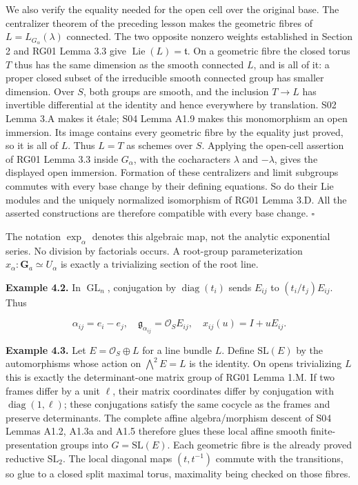 \documentclass[11pt,a4paper,openany]{report}
\begin{document}
We also verify the equality needed for the open cell over the original base. The centralizer theorem of the preceding lesson makes the geometric fibres of \(L=L_{G_\alpha}(\lambda)\) connected. The two opposite nonzero weights established in Section 2 and RG01 Lemma 3.3 give \(\operatorname{Lie}(L)=\mathfrak t\). On a geometric fibre the closed torus \(T\) thus has the same dimension as the smooth connected \(L\), and is all of it: a proper closed subset of the irreducible smooth connected group has smaller dimension. Over \(S\), both groups are smooth, and the inclusion \(T\to L\) has invertible differential at the identity and hence everywhere by translation. S02 Lemma 3.A makes it étale; S04 Lemma A1.9 makes this monomorphism an open immersion. Its image contains every geometric fibre by the equality just proved, so it is all of \(L\). Thus \(L=T\) as schemes over \(S\). Applying the open-cell assertion of RG01 Lemma 3.3 inside \(G_\alpha\), with the cocharacters \(\lambda\) and \(-\lambda\), gives the displayed open immersion. Formation of these centralizers and limit subgroups commutes with every base change by their defining equations. So do their Lie modules and the uniquely normalized isomorphism of RG01 Lemma 3.D. All the asserted constructions are therefore compatible with every base change. \(\square\)

The notation \(\exp_\alpha\) denotes this algebraic map, not the analytic exponential series. No division by factorials occurs. A root-group parameterization \(x_\alpha:\mathbf G_a\simeq U_\alpha\) is exactly a trivializing section of the root line.

\textbf{Example 4.2.} In \(\operatorname{GL}_n\), conjugation by \(\operatorname{diag}(t_i)\) sends \(E_{ij}\) to \((t_i/t_j)E_{ij}\). Thus

\[
\alpha_{ij}=e_i-e_j,\quad
\mathfrak g_{\alpha_{ij}}=\mathcal O_SE_{ij},\quad
x_{ij}(u)=I+uE_{ij}.
\]

\textbf{Example 4.3.} Let \(E=\mathcal O_S\oplus L\) for a line bundle \(L\). Define \(\mathrm{SL}(E)\) by the automorphisms whose action on \(\bigwedge^2E=L\) is the identity. On opens trivializing \(L\) this is exactly the determinant-one matrix group of RG01 Lemma 1.M. If two frames differ by a unit \(\ell\), their matrix coordinates differ by conjugation with \(\operatorname{diag}(1,\ell)\); these conjugations satisfy the same cocycle as the frames and preserve determinants. The complete affine algebra/morphism descent of S04 Lemmas A1.2, A1.3a and A1.5 therefore glues these local affine smooth finite-presentation groups into \(G=\mathrm{SL}(E)\). Each geometric fibre is the already proved reductive \(\mathrm{SL}_2\). The local diagonal maps \((t,t^{-1})\) commute with the transitions, so glue to a closed split maximal torus, maximality being checked on those fibres.
\end{document}
